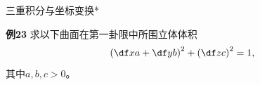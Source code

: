 \begin{frame}{三重积分与坐标变换*}
	\linespread{1.2}
	\begin{exampleblock}{{\bf 例23}\hfill}
		求以下曲面在第一卦限中所围立体体积
		$$\left(\df xa+\df yb\right)^2+\left(\df zc\right)^2=1,$$
		其中$a,b,c>0$。
	\end{exampleblock}
\end{frame}


% 
